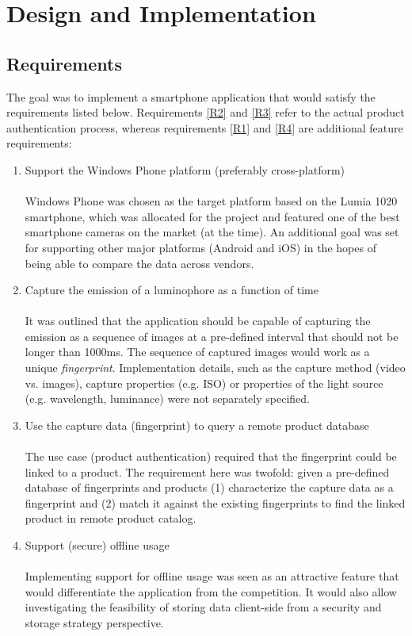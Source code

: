 \documentclass[thesis.tex]{subfiles}
\begin{document}
\chapter{Design and Implementation}
\label{chapter:design-implementation}

\section{Requirements}

The goal was to implement a smartphone application that would satisfy the requirements listed below. Requirements \ref{R2} and \ref{R3} refer to the actual product authentication process, whereas requirements \ref{R1} and \ref{R4} are additional feature requirements:

\begin{enumerate}[leftmargin=0.55in, label=\textbf{R\arabic*}]
	\item \label{R1} Support the Windows Phone platform (preferably cross-platform)\\ \\
	Windows Phone was chosen as the target platform based on the Lumia 1020 smartphone, which was allocated for the project and featured one of the best smartphone cameras on the market (at the time). An additional goal was set for supporting other major platforms (Android and iOS) in the hopes of being able to compare the data across vendors.

    \item \label{R2} Capture the emission of a luminophore as a function of time\\ \\
    It was outlined that the application should be capable of capturing the emission as a sequence of images at a pre-defined interval that should not be longer than 1000ms. The sequence of captured images would work as a unique \emph{fingerprint}. Implementation details, such as the capture method (video vs. images), capture properties (e.g. ISO) or properties of the light source (e.g. wavelength, luminance) were not separately specified.

    \item \label{R3} Use the capture data (fingerprint) to query a remote product database\\ \\
    The use case (product authentication) required that the fingerprint could be linked to a product. The requirement here was twofold: given a pre-defined database of fingerprints and products (1) characterize the capture data as a fingerprint and (2) match it against the existing fingerprints to find the linked product in remote product catalog.

	\item \label{R4} Support (secure) offline usage\\ \\
	Implementing support for offline usage was seen as an attractive feature that would differentiate the application from the competition. It would also allow investigating the feasibility of storing data client-side from a security and storage strategy perspective.
\end{enumerate}
\end{document}
